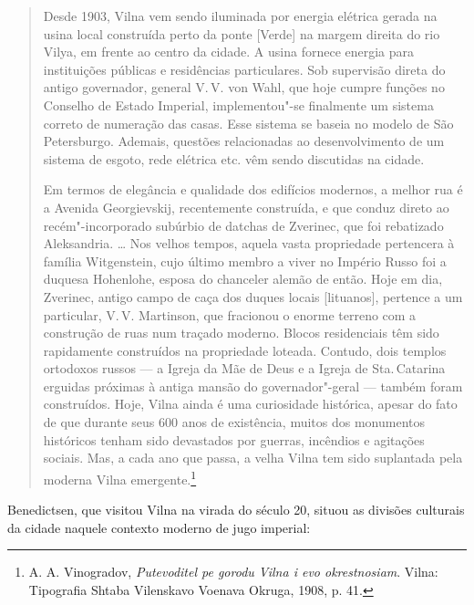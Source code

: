 \begin{quote}
Desde 1903, Vilna vem sendo iluminada por energia elétrica gerada na
usina local construída perto da ponte {[}Verde{]} na margem direita do
rio Vilya, em frente ao centro da cidade. A usina fornece energia para
instituições públicas e residências particulares. Sob supervisão direta
do antigo governador, general V.\,V. von Wahl, que hoje cumpre funções no
Conselho de Estado Imperial, implementou"-se finalmente um sistema
correto de numeração das casas. Esse sistema se baseia no modelo de São
Petersburgo. Ademais, questões relacionadas ao desenvolvimento de um
sistema de esgoto, rede elétrica etc. vêm sendo discutidas na cidade.

Em termos de elegância e qualidade dos edifícios modernos, a melhor rua
é a Avenida Georgievskij, recentemente construída, e que conduz direto
ao recém"-incorporado subúrbio de datchas de Zverinec, que foi rebatizado
Aleksandria. \ldots{} Nos velhos tempos, aquela vasta propriedade
pertencera à família Witgenstein, cujo último membro a viver no Império
Russo foi a duquesa Hohenlohe, esposa do chanceler alemão de então. Hoje
em dia, Zverinec, antigo campo de caça dos duques locais {[}lituanos{]},
pertence a um particular, V.\,V. Martinson, que fracionou o enorme
terreno com a construção de ruas num traçado moderno. Blocos
residenciais têm sido rapidamente construídos na propriedade loteada.
Contudo, dois templos ortodoxos russos --- a Igreja da Mãe de Deus e a
Igreja de Sta.\,Catarina erguidas próximas à antiga mansão do
governador"-geral --- também foram construídos. Hoje, Vilna ainda é uma
curiosidade histórica, apesar do fato de que durante seus 600 anos de
existência, muitos dos monumentos históricos tenham sido devastados por
guerras, incêndios e agitações sociais. Mas, a cada ano que passa, a
velha Vilna tem sido suplantada pela moderna Vilna emergente.\footnote{A.
  A. Vinogradov, \emph{Putevoditel pe gorodu Vilna i evo okrestnosiam}.
  Vilna: Tipografia Shtaba Vilenskavo Voenava Okruga, 1908, p. 41.}
\end{quote}

%

Benedictsen, que visitou Vilna na virada do século 20, situou as
divisões culturais da cidade naquele contexto moderno de jugo imperial:

